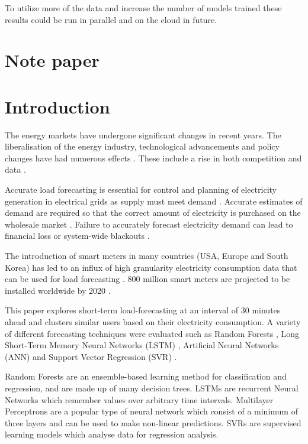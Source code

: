To utilize more of the data and increase the number of models trained these results could be run in parallel and on the cloud in future.



\section{Note paper}

\section{Introduction}

The energy markets have undergone significant changes in recent years. The liberalisation of the energy industry, technological advancements and policy changes have had numerous effects \cite{Viegas2016}. These include a rise in both competition and data \cite{sioshansi_2009, Clastres2011}. %

Accurate load forecasting is essential for control and planning of electricity generation in electrical grids as supply must meet demand \cite{Lu1993}. Accurate estimates of demand are required so that the correct amount of electricity is purchased on the wholesale market \cite{Dillon1991}. Failure to accurately forecast electricity demand can lead to financial loss or system-wide blackouts \cite{Hines2008}.

The introduction of smart meters in many countries (USA, Europe and South Korea) has led to an influx of high granularity electricity consumption data that can be used for load forecasting \cite{Depuru2011a}. 800 million smart meters are projected to be installed worldwide by 2020 \cite{Telefonica2014}. 

This paper explores short-term load-forecasting at an interval of 30 minutes ahead and clusters similar users based on their electricity consumption. A variety of different forecasting techniques were evaluated such as Random Forests \cite{TinKamHo}, Long Short-Term Memory Neural Networks (LSTM) \cite{lstm}, Artificial Neural Networks \cite{book:984557} (ANN) and Support Vector Regression (SVR) \cite{Drucker1997}. 

Random Forests are an ensemble-based learning method for classification and regression, and are made up of many decision trees. LSTMs are recurrent Neural Networks which remember values over arbitrary time intervals. Multilayer Perceptrons are a popular type of neural network which consist of a minimum of three layers and can be used to make non-linear predictions. SVRs are supervised learning models which analyse data for regression analysis.

